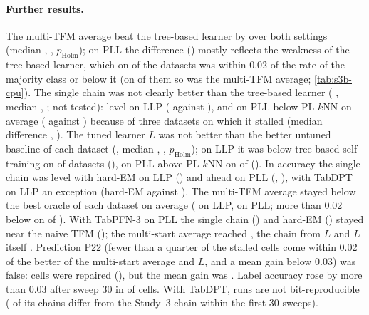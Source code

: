 \paragraph{Further results.} The multi-TFM average beat the tree-based learner by 
 over both settings (median , ,
$p_{\mathrm{Holm}}$); on PLL the difference () mostly reflects the
weakness of the tree-based learner, which on  of the  datasets was within
0.02 of the rate of the majority class or below it (on  of them so was the multi-TFM
average; \cref{tab:s3b-cpu}). The single chain was not clearly better than the tree-based learner
( , median , ; not tested):
level on LLP ( against ), and on PLL below PL-$k$NN on average (
against ) because of three datasets on which it stalled (median difference
, ). The tuned learner $L$ was not better than the better untuned
baseline of each dataset (, median , ,
$p_{\mathrm{Holm}}$); on LLP it was below tree-based self-training on  of
 datasets (), on PLL above PL-$k$NN on  of
 (). In accuracy the single chain was level with hard-EM on LLP
() and ahead on PLL (, ),
with TabDPT on LLP an exception (hard-EM  against ). The multi-TFM average
stayed  below the best oracle of each dataset on average ( on
LLP,  on PLL; more than 0.02 below on  of
). With TabPFN-3 on PLL the single chain () and hard-EM
() stayed near the naive TFM (); the multi-start average reached
, the chain from $L$  and $L$ itself . Prediction
P22 (fewer than a quarter of the  stalled cells come within 0.02 of the better of the multi-start
average and $L$, and a mean gain below 0.03) was false:  cells were repaired (), but
the mean gain was . Label accuracy rose by more than 0.03 after sweep 30 in  of
 cells. With TabDPT, runs are not bit-reproducible ( of its 
chains differ from the Study~3 chain within the first 30 sweeps).

